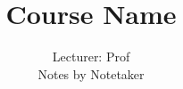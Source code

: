 \documentclass[12pt,twoside]{article}
\theoremstyle{plain}
\theoremstyle{remark}
\theoremstyle{definition}
\begin{document}
\title{Course Name}
\author{Lecturer: Prof \\ Notes by Notetaker}
\maketitle
\tableofcontents
\printindex
\end{document}
